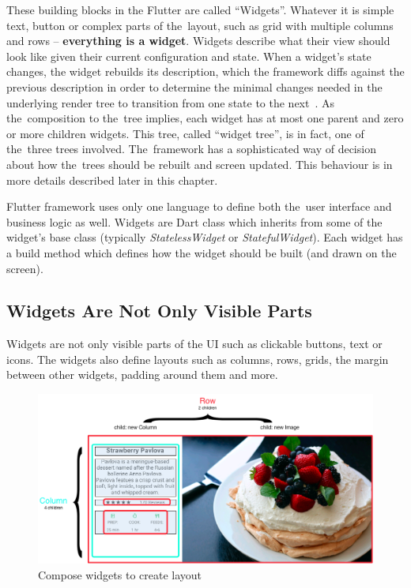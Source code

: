 These building blocks in the Flutter are called ``Widgets''. Whatever it is simple text, button or complex parts of the~layout, such as grid with multiple columns and rows -- \textbf{everything is a widget}.  Widgets describe what their view should look like given their current configuration and state. When a widget's state changes, the widget rebuilds its description, which the framework diffs against the previous description in order to determine the minimal changes needed in the underlying render tree to transition from one state to the next~\cite{flutter-widget-intro}. As the~composition to the~tree implies, each widget has at most one parent and zero or more children widgets. This tree, called ``widget tree'', is in fact, one of the~three trees involved. The~framework has a sophisticated way of decision about how the~trees should be rebuilt and screen updated. This behaviour is in more details described later in this chapter.

Flutter framework uses only one language to define both the~user interface and business logic as well.  Widgets are Dart class which inherits from some of the widget's base class (typically \textit{StatelessWidget} or \textit{StatefulWidget}). Each widget has a build method which defines how the widget should be built (and drawn on the screen). 
\subsection{Widgets Are Not Only Visible Parts}
Widgets are not only visible parts of the UI such as clickable buttons, text or icons. The widgets also define layouts such as columns, rows, grids, the margin between other widgets, padding around them and more. 

\begin{figure}[htp]
    \centering
    \includegraphics[width=0.75\linewidth]{img/flutter/layout_compose.png}
    \caption{Compose widgets to create layout~\cite{flutter-widget-layout}}
    \label{fig:flutter-compose-widget}
\end{figure}

